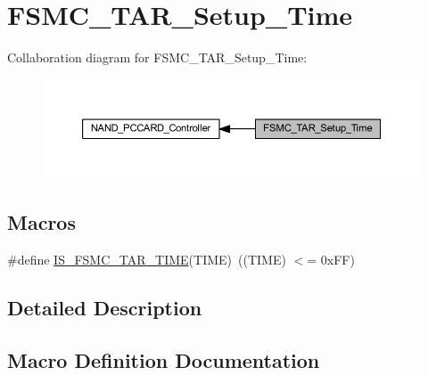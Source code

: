 \hypertarget{group___f_s_m_c___t_a_r___setup___time}{}\section{F\+S\+M\+C\+\_\+\+T\+A\+R\+\_\+\+Setup\+\_\+\+Time}
\label{group___f_s_m_c___t_a_r___setup___time}
Collaboration diagram for F\+S\+M\+C\+\_\+\+T\+A\+R\+\_\+\+Setup\+\_\+\+Time\+:
\nopagebreak
\begin{figure}[H]
\begin{center}
\leavevmode
\includegraphics[width=350pt]{group___f_s_m_c___t_a_r___setup___time}
\end{center}
\end{figure}
\subsection*{Macros}
\begin{DoxyCompactItemize}
\item 
\#define \hyperlink{group___f_s_m_c___t_a_r___setup___time_ga5b9e0f64c44ab68afca90cd28dedd8e3}{I\+S\+\_\+\+F\+S\+M\+C\+\_\+\+T\+A\+R\+\_\+\+T\+I\+ME}(T\+I\+ME)~((T\+I\+ME) $<$= 0x\+F\+F)
\end{DoxyCompactItemize}


\subsection{Detailed Description}


\subsection{Macro Definition Documentation}
\mbox{\label{group___f_s_m_c___t_a_r___setup___time_ga5b9e0f64c44ab68afca90cd28dedd8e3}} 
